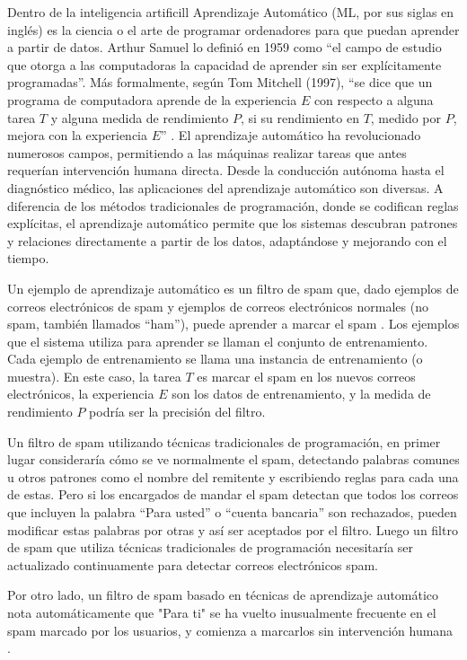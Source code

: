 Dentro de la inteligencia artificill Aprendizaje Automático (ML, por sus siglas en inglés) es la ciencia o el arte de programar ordenadores para que puedan aprender a partir de datos. Arthur Samuel lo definió en 1959 como ``el campo de estudio que otorga a las computadoras la capacidad de aprender sin ser explícitamente programadas''. Más formalmente, según Tom Mitchell (1997), ``se dice que un programa de computadora aprende de la experiencia \(E\) con respecto a alguna tarea \(T\) y alguna medida de rendimiento \(P\), si su rendimiento en \(T\), medido por \(P\), mejora con la experiencia \(E\)'' \citep{geron2022hands}. El aprendizaje automático ha revolucionado numerosos campos, permitiendo a las máquinas realizar tareas que antes requerían intervención humana directa. Desde la conducción autónoma hasta el diagnóstico médico, las aplicaciones del aprendizaje automático son diversas. A diferencia de los métodos tradicionales de programación, donde se codifican reglas explícitas, el aprendizaje automático permite que los sistemas descubran patrones y relaciones directamente a partir de los datos, adaptándose y mejorando con el tiempo.



Un ejemplo de aprendizaje automático es un filtro de spam que, dado ejemplos de correos electrónicos de spam y ejemplos de correos electrónicos normales (no spam, también llamados ``ham''), puede aprender a marcar el spam \citep{geron2022hands}. Los ejemplos que el sistema utiliza para aprender se llaman el conjunto de entrenamiento. Cada ejemplo de entrenamiento se llama una instancia de entrenamiento (o muestra). En este caso, la tarea \(T\) es marcar el spam en los nuevos correos electrónicos, la experiencia \(E\) son los datos de entrenamiento, y la medida de rendimiento \(P\) podría ser la precisión del filtro.

Un filtro de spam utilizando técnicas tradicionales de programación, en primer lugar consideraría cómo se ve normalmente el spam, detectando palabras comunes u otros patrones como el nombre del remitente y escribiendo reglas para cada una de estas. Pero si los encargados de mandar el spam detectan que todos los correos que incluyen la palabra ``Para usted'' o  ``cuenta bancaria'' son rechazados, pueden modificar estas palabras por otras y así ser aceptados por el filtro. Luego un filtro de spam que utiliza técnicas tradicionales de programación necesitaría ser actualizado continuamente para detectar correos electrónicos spam. 

Por otro lado, un filtro de spam basado en técnicas de aprendizaje automático nota automáticamente que "Para ti" se ha vuelto inusualmente frecuente en el spam marcado por los usuarios, y comienza a marcarlos sin intervención humana \citep{geron2022hands}.


